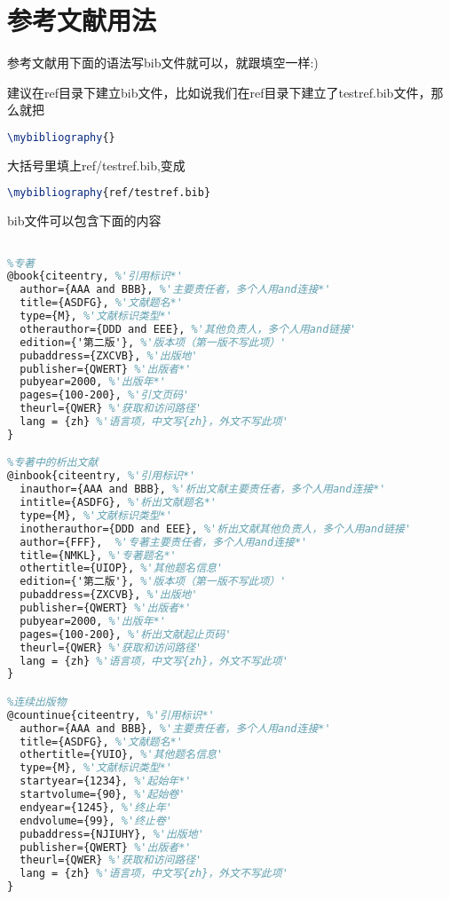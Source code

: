\section{参考文献用法}
参考文献用下面的语法写bib文件就可以，就跟填空一样:)\par
建议在ref目录下建立bib文件，比如说我们在ref目录下建立了testref.bib文件，那么就把
\begin{lstlisting}[language=tex,frame=single]
\mybibliography{}
\end{lstlisting}
大括号里填上ref/testref.bib,变成
\begin{lstlisting}[language=tex,frame=single]
\mybibliography{ref/testref.bib}
\end{lstlisting}
bib文件可以包含下面的内容
\begin{lstlisting}[language=tex,escapeinside='',frame=single]
%'下面提到的项，带*的是必有的，其他的选填'

%专著
@book{citeentry, %'引用标识*'
  author={AAA and BBB}, %'主要责任者，多个人用and连接*'
  title={ASDFG}, %'文献题名*'
  type={M}, %'文献标识类型*'
  otherauthor={DDD and EEE}, %'其他负责人，多个人用and链接'
  edition={'第二版'}, %'版本项（第一版不写此项）'
  pubaddress={ZXCVB}, %'出版地'
  publisher={QWERT} %'出版者*'
  pubyear=2000, %'出版年*'
  pages={100-200}, %'引文页码'
  theurl={QWER} %'获取和访问路径'
  lang = {zh} %'语言项，中文写{zh}，外文不写此项'
}

%专著中的析出文献
@inbook{citeentry, %'引用标识*'
  inauthor={AAA and BBB}, %'析出文献主要责任者，多个人用and连接*'
  intitle={ASDFG}, %'析出文献题名*'
  type={M}, %'文献标识类型*'
  inotherauthor={DDD and EEE}, %'析出文献其他负责人，多个人用and链接'
  author={FFF},  %'专著主要责任者，多个人用and连接*'
  title={NMKL}, %'专著题名*'
  othertitle={UIOP}, %'其他题名信息'
  edition={'第二版'}, %'版本项（第一版不写此项）'
  pubaddress={ZXCVB}, %'出版地'
  publisher={QWERT} %'出版者*'
  pubyear=2000, %'出版年*'
  pages={100-200}, %'析出文献起止页码'
  theurl={QWER} %'获取和访问路径'
  lang = {zh} %'语言项，中文写{zh}，外文不写此项'
}

%连续出版物
@countinue{citeentry, %'引用标识*'
  author={AAA and BBB}, %'主要责任者，多个人用and连接*'
  title={ASDFG}, %'文献题名*'
  othertitle={YUIO}, %'其他题名信息'
  type={M}, %'文献标识类型*'
  startyear={1234}, %'起始年*'
  startvolume={90}, %'起始卷'
  endyear={1245}, %'终止年'
  endvolume={99}, %'终止卷'
  pubaddress={NJIUHY}, %'出版地'
  publisher={QWERT} %'出版者*'
  theurl={QWER} %'获取和访问路径'
  lang = {zh} %'语言项，中文写{zh}，外文不写此项'
}


\end{lstlisting}

